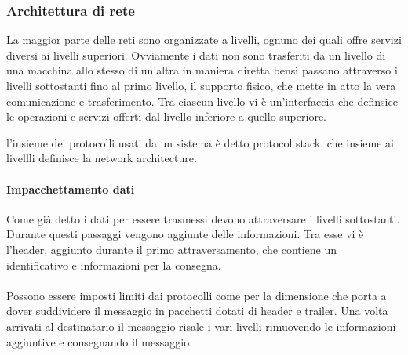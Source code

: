 \documentclass{subfiles}
\begin{document}
\subsubsection{Architettura di rete}
    La maggior parte delle reti sono organizzate a livelli, ognuno dei quali offre servizi diversi ai livelli superiori. Ovviamente i 
    dati non sono trasferiti da un livello di una macchina allo stesso di un'altra in maniera diretta bensì passano attraverso i livelli 
    sottostanti fino al primo livello, il supporto fisico, che mette in atto la vera comunicazione e trasferimento.
    Tra ciascun livello vi è un'interfaccia che definsice le operazioni e servizi offerti dal livello inferiore a quello superiore.

    \begin{Note*}
        l'insieme dei protocolli usati da un sistema è detto protocol stack, che insieme ai livellli definisce la network architecture.
    \end{Note*}

    \paragraph{Impacchettamento dati}
    Come già detto i dati per essere trasmessi devono attraversare i livelli sottostanti. Durante questi passaggi vengono aggiunte 
    delle informazioni. Tra esse vi è l'header, aggiunto durante il primo attraversamento, che contiene un identificativo e
    informazioni per la consegna.
    \\ \\
    Possono essere imposti limiti dai protocolli come per la dimensione che porta a dover suddividere il messaggio in pacchetti dotati 
    di header e trailer. Una volta arrivati al destinatario il messaggio risale i vari livelli rimuovendo le informazioni aggiuntive e 
    consegnando il messaggio.    
\end{document}
